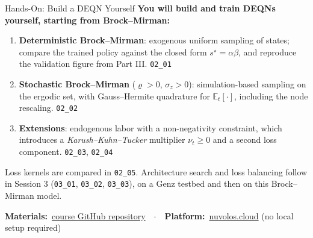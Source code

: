 \documentclass[aspectratio=169,11pt]{beamer}
\newcommand{\emphc}[1]{\textcolor{harvardcrimson}{#1}}
\newcommand{\Et}[1]{\mathbb{E}_t\!\left[#1\right]}
\begin{document}
\begin{frame}{Hands-On: Build a DEQN Yourself}
\textbf{You will build and train DEQNs yourself, starting from Brock--Mirman:}

\vspace{0.4em}
\begin{enumerate}\itemsep4pt
    \item \textbf{Deterministic Brock--Mirman}: exogenous uniform sampling of states; compare the trained policy against the closed form $s^\star = \alpha\beta$, and reproduce the validation figure from Part III. \hfill{\footnotesize\texttt{02\_01}}
    \item \textbf{Stochastic Brock--Mirman} ($\varrho > 0$, $\sigma_z > 0$): \emphc{simulation-based sampling} on the ergodic set, with Gauss--Hermite quadrature for $\Et{\cdot}$, including the node rescaling. \hfill{\footnotesize\texttt{02\_02}}
    \item \textbf{Extensions}: endogenous labor with a non-negativity constraint, which introduces a \emph{Karush--Kuhn--Tucker} multiplier $\nu_t \ge 0$ and a second loss component. \hfill{\footnotesize\texttt{02\_03}, \texttt{02\_04}}
\end{enumerate}

\vspace{0.4em}
{\footnotesize Loss kernels are compared in \texttt{02\_05}. Architecture search and loss balancing follow in Session 3 (\texttt{03\_01}, \texttt{03\_02}, \texttt{03\_03}), on a Genz testbed and then on this Brock--Mirman model.}

\vspace{0.5em}
\begin{center}
{\footnotesize \textbf{Materials:}~\href{https://github.com/sischei/deep_learning_padova_0926}{course GitHub repository}~~$\cdot$~~\textbf{Platform:}~\href{https://nuvolos.cloud}{nuvolos.cloud} (no local setup required)}
\end{center}
\end{frame}
\end{document}
